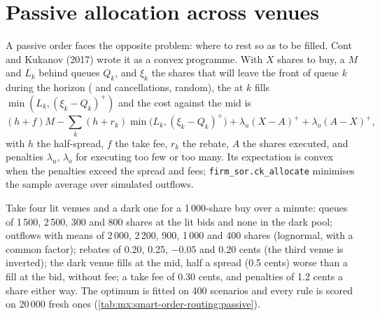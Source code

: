 \section{Passive allocation across venues}

A passive order faces the opposite problem: where to rest so as to be filled. Cont and Kukanov (2017) wrote it as a convex programme. With $X$ shares
to buy, a  $M$ and  $L_k$ behind queues $Q_k$, and $\xi_k$ the shares that will leave the front of queue $k$ during the horizon
( and cancellations, random), the  at $k$ fills $\min(L_k,(\xi_k-Q_k)^+)$ and the cost against the mid is
\[
(h+f)M-\sum_k(h+r_k)\min\bigl(L_k,(\xi_k-Q_k)^+\bigr)+\lambda_u(X-A)^++\lambda_o(A-X)^+,
\]
with $h$ the half-spread, $f$ the take fee, $r_k$ the rebate, $A$ the shares executed, and penalties $\lambda_u$, $\lambda_o$ for executing too few or
too many. Its expectation is convex when the penalties exceed the spread and fees; \texttt{firm\_sor.ck\_allocate} minimises the sample average over
simulated outflows.

\label{lst:mx:smart-order-routing:ck}

Take four lit venues and a dark one for a 1\,000-share buy over a minute: queues of 1\,500, 2\,500, 300 and 800 shares at the lit bids and none in the
dark pool; outflows with means of 2\,000, 2\,200, 900, 1\,000 and 400 shares (lognormal, with a common factor); rebates of 0.20, 0.25, $-0.05$ and 0.20
cents (the third venue is inverted); the dark venue fills at the mid, half a spread (0.5 cents) worse than a fill at the bid, without fee; a take fee of
0.30 cents, and penalties of 1.2 cents a share either way. The optimum is fitted on 400 scenarios and every rule is scored on 20\,000 fresh ones
(\cref{tab:mx:smart-order-routing:passive}).


